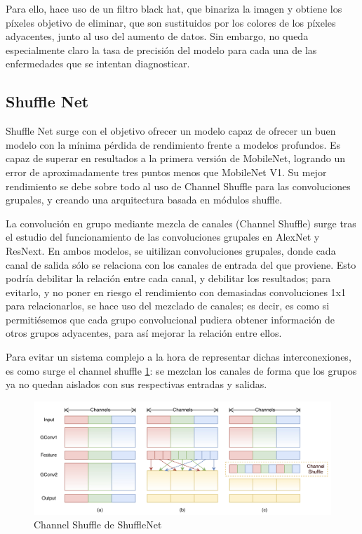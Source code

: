 Para ello, hace uso de un filtro black hat, que binariza la imagen y obtiene los píxeles objetivo de eliminar, que son sustituidos por los colores de los píxeles adyacentes, junto al uso del aumento de datos. Sin embargo, no queda especialmente claro la tasa de precisión del modelo para cada una de las enfermedades que se intentan diagnosticar.

\subsection{Shuffle Net}

Shuffle Net \cite{zhang2017shufflenet,shufflenetreview} surge con el objetivo ofrecer un modelo capaz de ofrecer un buen modelo con la mínima pérdida de rendimiento frente a modelos profundos. Es capaz de superar en resultados a la primera versión de MobileNet, logrando un error de aproximadamente tres puntos menos que MobileNet V1. Su mejor rendimiento se debe sobre todo al uso de Channel Shuffle para las convoluciones grupales, y creando una arquitectura basada en módulos shuffle.

La convolución en grupo mediante mezcla de canales (Channel Shuffle) surge tras el estudio del funcionamiento de las convoluciones grupales en 	AlexNet\cite{NIPS2012_c399862d} y ResNext. En ambos modelos, se uitilizan convoluciones grupales, donde cada canal de salida sólo se relaciona con los canales de entrada del que proviene. Esto podría debilitar la relación entre cada canal, y debilitar los resultados; para evitarlo, y no poner en riesgo el rendimiento con demasiadas convoluciones 1x1 para relacionarlos, se hace uso del mezclado de canales; es decir, es como si permitiésemos que cada grupo convolucional pudiera obtener información de otros grupos adyacentes, para así mejorar la relación entre ellos.

Para evitar un sistema complejo a la hora de representar dichas interconexiones, es como surge el channel shuffle \ref{shufflechannels}: se mezclan los canales de forma que los grupos ya no quedan aislados con sus respectivas entradas y salidas.

    \begin{figure}[H]

	\centering
	\includegraphics[scale = 0.2]{imagenes/shufflechannels.png}
	\caption{Channel Shuffle de ShuffleNet}
	\label{shufflechannels}
\end{figure}

